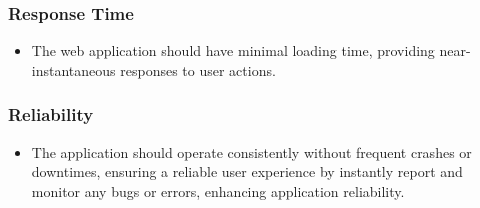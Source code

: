 \subsubsection{Response Time}
\begin{itemize}
	\item The web application should have minimal loading time, providing near-instantaneous responses to user actions.
\end{itemize}

\subsubsection{Reliability}
\begin{itemize}
	\item The application should operate consistently without frequent crashes or downtimes, ensuring a reliable user experience by instantly report and monitor any bugs or errors, enhancing application reliability.
\end{itemize}






